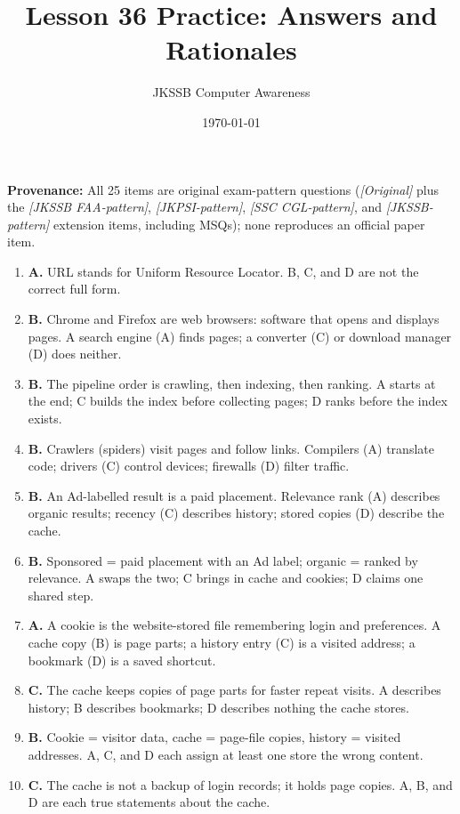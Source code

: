 \documentclass[11pt]{article}
\title{Lesson 36 Practice: Answers and Rationales}
\author{JKSSB Computer Awareness}
\date{\today}
\begin{document}
\maketitle
\noindent\textbf{Provenance:} All 25 items are original exam-pattern questions (\textit{[Original]} plus the \textit{[JKSSB FAA-pattern]}, \textit{[JKPSI-pattern]}, \textit{[SSC CGL-pattern]}, and \textit{[JKSSB-pattern]} extension items, including MSQs); none reproduces an official paper item.
\begin{enumerate}[label=\textbf{Q\arabic*.}, leftmargin=*]
\item \textbf{A.} URL stands for Uniform Resource Locator. B, C, and D are
  not the correct full form.
\item \textbf{B.} Chrome and Firefox are web browsers: software that opens
  and displays pages. A search engine (A) finds pages; a converter (C) or
  download manager (D) does neither.
\item \textbf{B.} The pipeline order is crawling, then indexing, then
  ranking. A starts at the end; C builds the index before collecting pages;
  D ranks before the index exists.
\item \textbf{B.} Crawlers (spiders) visit pages and follow links. Compilers
  (A) translate code; drivers (C) control devices; firewalls (D) filter
  traffic.
\item \textbf{B.} An Ad-labelled result is a paid placement. Relevance rank
  (A) describes organic results; recency (C) describes history; stored copies
  (D) describe the cache.
\item \textbf{B.} Sponsored = paid placement with an Ad label; organic =
  ranked by relevance. A swaps the two; C brings in cache and cookies; D
  claims one shared step.
\item \textbf{A.} A cookie is the website-stored file remembering login and
  preferences. A cache copy (B) is page parts; a history entry (C) is a
  visited address; a bookmark (D) is a saved shortcut.
\item \textbf{C.} The cache keeps copies of page parts for faster repeat
  visits. A describes history; B describes bookmarks; D describes nothing the
  cache stores.
\item \textbf{B.} Cookie = visitor data, cache = page-file copies, history =
  visited addresses. A, C, and D each assign at least one store the wrong
  content.
\item \textbf{C.} The cache is not a backup of login records; it holds page
  copies. A, B, and D are each true statements about the cache.

\end{enumerate}
\end{document}
